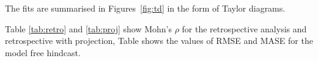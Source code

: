 \documentclass[a4paper]{article}
\begin{document}
The fits are summarised in Figures~\ref{fig:td} in the form of Taylor diagrams. 


Table \ref{tab:retro} and  \ref{tab:proj} show Mohn's $\rho$ for the retrospective analysis and retrospective with projection, Table \label{tab:rmse} shows the values of RMSE and \label{tab:mase} MASE for the model free hindcast.
\end{document}
